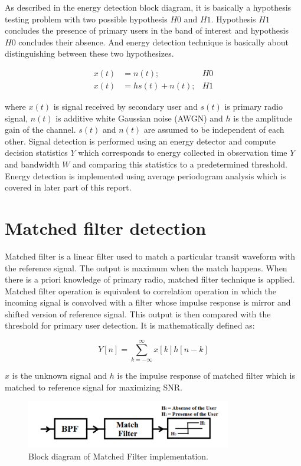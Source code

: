 As described in the energy detection block diagram, it is basically a hypothesis
testing problem with two possible hypothesis $H0$ and $H1$. Hypothesis $H1$ concludes 
the presence of primary users in the band of interest and hypothesis $H0$ 
concludes their absence. And energy detection technique is basically about 
distinguishing between these two hypothesizes\cite{sarijari09}.


\begin{align}
x(t) & = n(t); & H0 \nonumber \\
x(t) & = hs(t)+n(t); & H1 \nonumber
\end{align}

where $x(t)$ is signal received by secondary user and $s(t)$ is primary radio 
signal, $n(t)$ is additive white Gaussian noise (AWGN) and $h$ is the amplitude gain
of the channel. $s(t)$ and $n(t)$ are assumed to be independent of each other. 
Signal detection is performed using an energy detector and compute decision 
statistics $Y$ which corresponds to energy collected in observation time $Y$ and 
bandwidth $W$ and comparing this statistics to a predetermined threshold. Energy 
detection is implemented using average periodogram analysis which is covered in 
later part of this report.


\section{Matched filter detection}
Matched filter is a linear filter used to match a particular transit waveform 
with the reference signal. The output is maximum when the match happens. When 
there is a priori knowledge of primary radio, matched filter technique is 
applied. Matched filter operation is equivalent to correlation operation in 
which the incoming signal is convolved with a filter whose impulse response is 
mirror and shifted version of reference signal. This output is then compared 
with the threshold for primary user detection. It is mathematically defined as:

\begin{equation*}
Y[n] = \sum_{k=-\infty}^{\infty}x[k]h[n-k]
\end{equation*}

$x$ is the unknown signal and $h$ is the impulse response of matched filter which is 
matched to reference signal for maximizing SNR. 

\begin{figure}[h]
\centering
\includegraphics[width=0.8\textwidth]{matchedFilter}
\caption[Matched Filter implementation]{Block diagram 
of Matched Filter implementation.}
\label{matchedFilter}
\end{figure}

